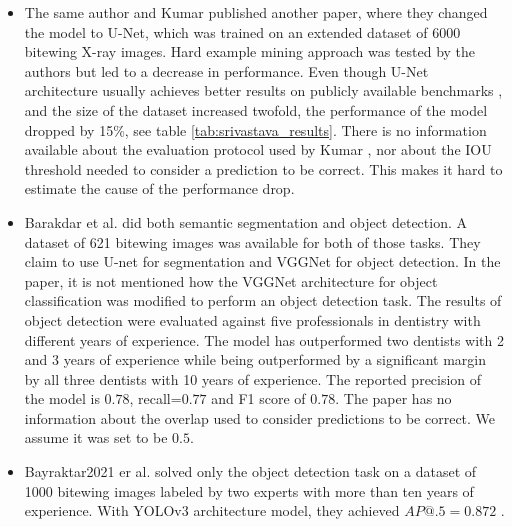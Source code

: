 \begin{itemize}
    \item{The same author and Kumar \cite{Kumar2018}} published another paper, where they changed the model to U-Net, which was trained on an extended dataset of 6000 bitewing X-ray images. Hard example mining approach was tested by the authors but led to a decrease in performance. Even though U-Net architecture usually achieves better results on publicly available benchmarks \cite{paperwithcode, Zhang2019}, and the size of the dataset increased twofold, the performance of the model dropped by 15\%, see table \ref{tab:srivastava_results}. There is no information available about the evaluation protocol used by Kumar \cite{Kumar2018}, nor about the IOU threshold needed to consider a prediction to be correct. This makes it hard to estimate the cause of the performance drop.
    \item{Barakdar et al. \cite{Bayrakdar2021}} did both semantic segmentation and object detection. A dataset of 621 bitewing images was available for both of those tasks. They claim to use U-net for segmentation and VGGNet for object detection. In the paper, it is not mentioned how the VGGNet architecture for object classification was modified to perform an object detection task. The results of object detection were evaluated against five professionals in dentistry with different years of experience. The model has outperformed two dentists with 2 and 3 years of experience while being outperformed by a significant margin by all three dentists with 10 years of experience. The reported precision of the model is $0.78$, recall=$0.77$ and F1 score of $0.78$. The paper has no information about the overlap used to consider predictions to be correct. We assume it was set to be $0.5$.
    \item{Bayraktar2021 er al. \cite{Bayraktar2021}} solved only the object detection task on a dataset of 1000 bitewing images labeled by two experts with more than ten years of experience. With YOLOv3 architecture model, they achieved $AP@.5 = 0.872$ .
\end{itemize}

